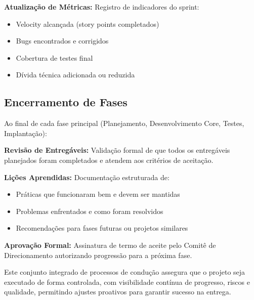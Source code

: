 \textbf{Atualização de Métricas:} Registro de indicadores do sprint:
\begin{itemize}
    \item Velocity alcançada (story points completados)
    \item Bugs encontrados e corrigidos
    \item Cobertura de testes final
    \item Dívida técnica adicionada ou reduzida
\end{itemize}

\subsection{Encerramento de Fases}

Ao final de cada fase principal (Planejamento, Desenvolvimento Core, Testes, Implantação):

\textbf{Revisão de Entregáveis:} Validação formal de que todos os entregáveis planejados foram completados e atendem aos critérios de aceitação.

\textbf{Lições Aprendidas:} Documentação estruturada de:
\begin{itemize}
    \item Práticas que funcionaram bem e devem ser mantidas
    \item Problemas enfrentados e como foram resolvidos
    \item Recomendações para fases futuras ou projetos similares
\end{itemize}

\textbf{Aprovação Formal:} Assinatura de termo de aceite pelo Comitê de Direcionamento autorizando progressão para a próxima fase.

Este conjunto integrado de processos de condução assegura que o projeto seja executado de forma controlada, com visibilidade contínua de progresso, riscos e qualidade, permitindo ajustes proativos para garantir sucesso na entrega.
